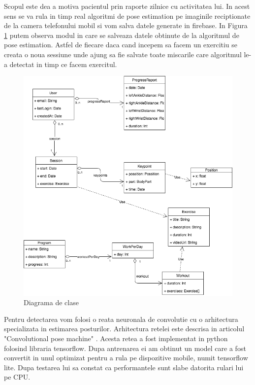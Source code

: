 Scopul este dea a motiva pacientul prin raporte zilnice cu activitatea lui.
In acest sens se va rula in timp real algoritmi de pose estimation pe imaginile reciptionate 
de la camera telefonului mobil si vom salva datele generate in firebase.
In Figura \ref{fig:uml-mobile} putem observa modul in care se salveaza datele obtinute de la algoritmul de pose estimation.
Astfel de fiecare daca cand incepem sa facem un exercitiu se creata o noua sessiune unde ajung sa fie salvate toate miscarile care algoritmul le-a detectat in timp ce facem exercitul.
 \begin{figure}[htbp]
	\centerline{\includegraphics[scale=0.6]{fig/uml-mobile.png}}  
	\caption{Diagrama de clase}
	\label{fig:uml-mobile}
\end{figure}

Pentru detectarea vom folosi o reata neuronala de convolutie cu o arhitectura specializata in estimarea posturilor.
Arhitectura retelei este descrisa in articolul "Convolutional pose machine" \cite{DBLP:journals/corr/WeiRKS16}.
Acesta retea a fost implementat in python folosind libraria tensorflow. Dupa antrenarea ei am obtinut un model 
care a fost convertit in unul optimizat pentru a rula pe dispozitive mobile, numit tensorflow lite.
Dupa testarea lui sa constat ca performantele sunt slabe datorita rulari lui pe CPU.

